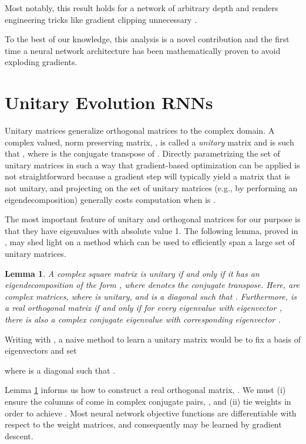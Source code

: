 \documentclass{article}
\newtheorem{lemma}{Lemma}
\begin{document}
Most notably, this result holds for a network of arbitrary depth and renders engineering tricks
like gradient clipping unnecessary \citep{Pascanu2013}. 

To the best of our knowledge, this analysis is a novel contribution and the first time a 
neural network architecture has been mathematically proven to avoid exploding gradients. 

\vspace{-1mm}

\section{Unitary Evolution RNNs}
\label{sec:uRNN}
\vspace{-1mm}
Unitary matrices generalize orthogonal matrices to the complex domain.
A complex valued, norm preserving matrix,
, is called a \textit{unitary} matrix and is such that 
, where  is the conjugate transpose
of .  Directly parametrizing the set of unitary matrices in such a way that gradient-based
optimization can be applied is not straightforward because a gradient step will typically yield
a matrix that is not unitary, and projecting on the set of unitary matrices (e.g., by performing
an eigendecomposition) generally costs  computation when  is .

The most important feature of unitary and orthogonal matrices for our purpose is that they have eigenvalues
 with absolute value 1. The following lemma, proved in \cite{linalgbook}, may shed light on a 
method which can be used to efficiently span a large set of unitary matrices.

\begin{lemma}
  A complex square matrix  is unitary if and only if it has an eigendecomposition of the form
  , where  denotes the conjugate transpose.
  Here,  are
  complex matrices, where  is unitary, and  is a diagonal such that . 
  Furthermore,  is a real orthogonal matrix if and only if for every eigenvalue  with eigenvector , there is also a complex conjugate
  eigenvalue  with 
  corresponding eigenvector  .
\label{lemma}
\end{lemma}

Writing  with , a naive method to learn a unitary matrix would be to
fix a basis of eigenvectors  and set

\vspace{-0.5mm}
where  is a diagonal such that . 

Lemma \ref{lemma} informs us how to construct a real orthogonal matrix, .
We must (i) ensure the columns of  come in complex conjugate pairs, , and
(ii) tie weights  in order to achieve . 
Most neural network objective functions are differentiable with respect to the weight matrices,
and consequently  may be learned by gradient descent. 
\end{document}
